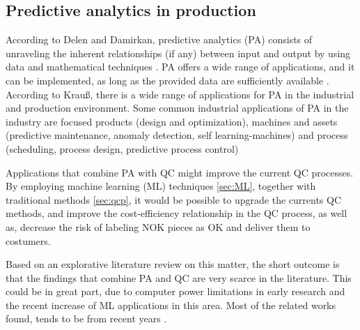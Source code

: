 \documentclass[5p,times,procedia]{elsarticle}
\begin{document}
\subsection{Predictive analytics in production}

According to Delen and Damirkan, predictive analytics (PA) consists of unraveling the inherent relationships (if any) between input and output by using data and mathematical techniques \cite{delen2013data}.
PA offers a wide range of applications, and it can be implemented, as long as the provided data are sufficiently available \cite{bishop2006pattern}.
According to Krauß, there is a wide range of applications for PA in the industrial and production environment. Some common industrial applications of PA in the industry are focused products (design and optimization), machines and assets (predictive maintenance, anomaly detection, self learning-machines) and process (scheduling, process design, predictive process control)\cite{krauss2019machine}

Applications that combine PA with QC might improve the current QC processes. By employing machine learning (ML) techniques \ref{sec:ML}, together with traditional methods \ref{sec:qcp}, it would be possible to upgrade the currents QC methods, and improve the cost-efficiency relationship in the QC process, as well as, decrease the risk of labeling NOK pieces as OK and deliver them to costumers.

Based on an explorative literature review on this matter, the short outcome is that the findings that combine PA and QC are very scarce in the literature. This could be in great part, due to computer power limitations in early research and the recent increase of ML applications in this area. 
Most of the related works found, tends to be from recent years \cite{krauss2020automated, krauss2019machine, aumi2012model,Selmaier2019PQXray, Sohnius2019PASurfacequality, ritter1992neue}.
\end{document}
